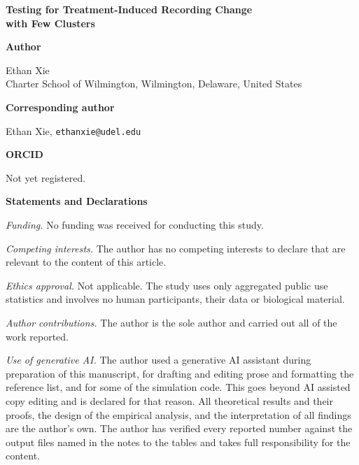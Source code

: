 \documentclass[12pt]{article}
\begin{document}
\thispagestyle{empty}

\begin{center}
{\large\bfseries Testing for Treatment-Induced Recording Change\\[2pt]
with Few Clusters}
\end{center}

\vspace{18pt}

\noindent\textbf{Author}

\smallskip

\noindent Ethan Xie\\
Charter School of Wilmington, Wilmington, Delaware, United States

\vspace{12pt}

\noindent\textbf{Corresponding author}

\smallskip

\noindent Ethan Xie, \texttt{ethanxie@udel.edu}

\vspace{12pt}

\noindent\textbf{ORCID}

\smallskip

\noindent Not yet registered.

\vspace{18pt}

\noindent\textbf{Statements and Declarations}

\smallskip

\noindent\textit{Funding.} No funding was received for conducting this study.

\smallskip

\noindent\textit{Competing interests.} The author has no competing interests to
declare that are relevant to the content of this article.

\smallskip

\noindent\textit{Ethics approval.} Not applicable. The study uses only
aggregated public use statistics and involves no human participants, their data
or biological material.

\smallskip

\noindent\textit{Author contributions.} The author is the sole author and
carried out all of the work reported.

\smallskip

\noindent\textit{Use of generative AI.} The author used a generative AI
assistant during preparation of this manuscript, for drafting and editing prose
and formatting the reference list, and for some of the simulation code. This
goes beyond AI assisted copy editing and is declared for that reason. All
theoretical results and their proofs, the design of the empirical analysis, and
the interpretation of all findings are the author's own. The author has verified
every reported number against the output files named in the notes to the tables
and takes full responsibility for the content.
\end{document}

